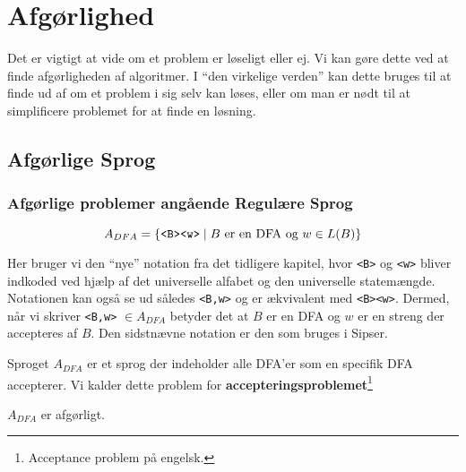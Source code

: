 \chapter{Afgørlighed}

Det er vigtigt at vide om et problem er løseligt eller ej. Vi kan gøre dette ved at finde afgørligheden af algoritmer. I ``den virkelige verden'' kan dette bruges til at finde ud af om et problem i sig selv kan løses, eller om man er nødt til at simplificere problemet for at finde en løsning.

\section{Afgørlige Sprog}%
\label{sec:decideablelanguages}

\subsection{Afgørlige problemer angående Regulære Sprog}%
\label{subsec:afgørlighedregulære}



\begin{equation*}
	A_{DFA} = \{\text{\texttt{<B><w>}} \mid B \text{ er en DFA og } w \in L(B) \}
\end{equation*}

Her bruger vi den ``nye'' notation fra det tidligere kapitel, hvor \texttt{<B>} og \texttt{<w>} bliver indkoded ved hjælp af det universelle alfabet og den universelle statemængde. Notationen kan også se ud således \texttt{<B,w>} og er ækvivalent med \texttt{<B><w>}. Dermed, når vi skriver \texttt{<B,w>} $\in A_{DFA}$ betyder det at $B$ er en DFA og $w$ er en streng der accepteres af $B$. Den sidstnævne notation er den som bruges i Sipser.

Sproget $A_{DFA}$ er et sprog der indeholder alle DFA'er som en specifik DFA accepterer. Vi kalder dette problem for \textbf{accepteringsproblemet}\footnote{Acceptance problem på engelsk.}

\begin{theorem}
	\label{teo:dfadecidable}
	$A_{DFA}$ er afgørligt.
\end{theorem}

